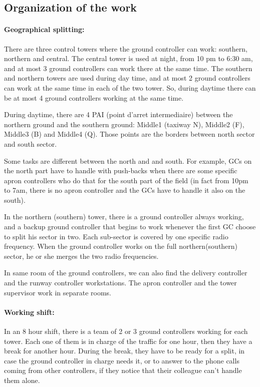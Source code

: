 \documentclass{article}
\begin{document}
\subsection{Organization of the work}
\paragraph{Geographical splitting:}There are three control towers where the ground controller can work: southern, northern and central. The central tower is used at night, from 10 pm to 6:30 am, and at most 3 ground controllers can work there at the same time. The southern and northern towers are used during day time, and at most 2 ground controllers can work at the same time in each of the two tower. So, during daytime there can be at most 4 ground controllers working at the same time.

During daytime, there are 4 PAI (point d'arret intermediaire) between the northern ground and the southern ground: Middle1 (taxiway N), Middle2 (F), Middle3 (B) and Middle4 (Q). Those points are the borders between north sector and south sector.

Some tasks are different between the north and and south. For example, GCs on the north part have to handle with push-backs when there are some specific apron controllers who do that for the south part of the field (in fact from 10pm to 7am, there is no apron controller and the GCs have to handle it also on the south). 

In the northern (southern) tower, there is a ground controller always working, and a backup ground controller that begins to work whenever the first GC choose to split his sector in two. Each sub-sector is covered by one specific radio frequency. When the ground controller works on the full northern(southern) sector, he or she merges the two radio frequencies.

In same room of the ground controllers, we can also find the delivery controller and the runway controller workstations. The apron controller and the tower supervisor work in separate rooms.

\paragraph{Working shift:} In an 8 hour shift, there is a team of 2 or 3 ground controllers working for each tower. Each one of them is in charge of the traffic for one hour, then they have a break for another hour. During the break, they have to be ready for a split, in case the ground controller in charge needs it, or to answer to the phone calls coming from other controllers, if they notice that their colleague can't handle them alone. 
\end{document}
